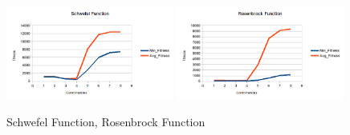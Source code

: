 \documentclass[b5paper,11pt, abstraction, titlepage]{scrartcl}
\begin{document}
\begin{CJK}{UTF8}{gbsn}
\begin{figure}
  \centering
  \includegraphics[width=0.49\textwidth]{schb}
  \includegraphics[width=0.49\textwidth]{rosb}
  \caption{Schwefel Function, Rosenbrock Function}
\end{figure}


\end{CJK}
\end{document}
